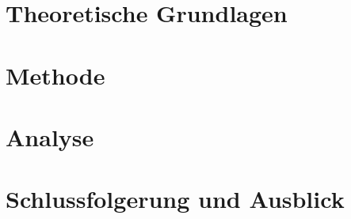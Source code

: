 \documentclass[a4paper,11pt,twoside]{memoir}
\begin{document}


\chapter{Theoretische Grundlagen}
\label{ch:theorie}



\chapter{Methode}
\label{ch:methode}



\chapter{Analyse}
\label{ch:analyse}



\chapter{Schlussfolgerung und Ausblick}
\label{ch:ausblick}





\appendix



\end{document}
